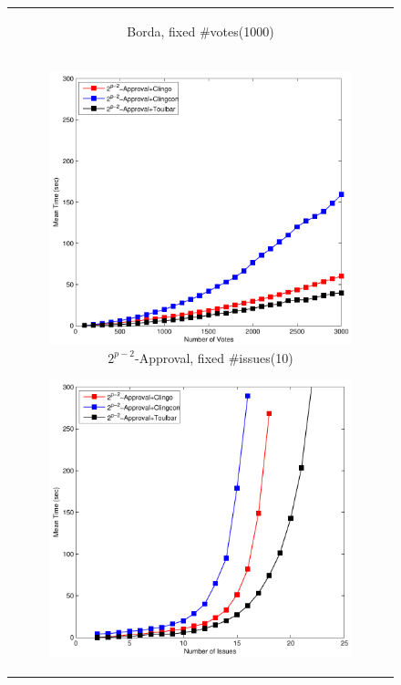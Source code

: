 \begin{figure}[ht!]
\begin{tabular}{c}
\begin{subfigure}[b]{0.44\textwidth}
    \caption{Borda, fixed \#votes(1000)}
		\label{fig:comparison:win:2}
	\end{subfigure}
  \\
  \begin{subfigure}[b]{0.44\textwidth}
		\includegraphics[width=\textwidth]{figs/expAppFIMSCICP.pdf}
    \caption{$2^{p-2}$-Approval, fixed \#issues(10)}
		\label{fig:comparison:win:3}
	\end{subfigure}
  \begin{subfigure}[b]{0.44\textwidth}
		\includegraphics[width=\textwidth]{figs/expAppFVMSCICP.pdf}

\end{subfigure}
\end{tabular}
\end{figure}
